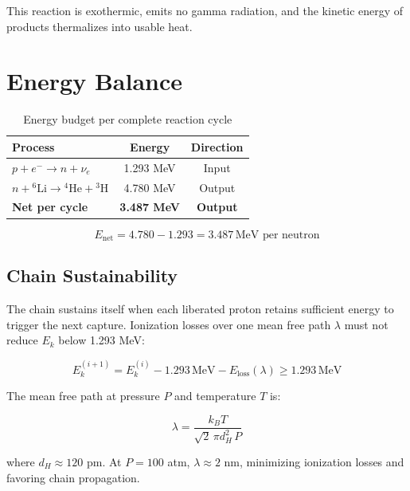 \documentclass[12pt,a4paper]{article}
\begin{document}
This reaction is exothermic, emits no gamma radiation, and
the kinetic energy of products thermalizes into usable heat.

\section{Energy Balance}

\begin{table}[h!]
\centering
\caption{Energy budget per complete reaction cycle}
\vspace{0.5em}
\begin{tabular}{lcc}
\toprule
\textbf{Process} & \textbf{Energy} & \textbf{Direction} \\
\midrule
$p + e^- \rightarrow n + \nu_e$                               & 1.293 MeV & Input  \\
$n + {}^6\text{Li} \rightarrow {}^4\text{He} + {}^3\text{H}$ & 4.780 MeV & Output \\
\midrule
\textbf{Net per cycle}                                         & \textbf{3.487 MeV} & \textbf{Output} \\
\bottomrule
\end{tabular}
\end{table}

\begin{equation}
  \boxed{E_\text{net} = 4.780 - 1.293 = 3.487\,\text{MeV per neutron}}
\end{equation}

\subsection{Chain Sustainability}

The chain sustains itself when each liberated proton retains
sufficient energy to trigger the next capture. Ionization losses
over one mean free path $\lambda$ must not reduce $E_k$ below
1.293 MeV:

\begin{equation}
  E_k^{(i+1)} = E_k^{(i)} - 1.293\,\text{MeV} - E_\text{loss}(\lambda)
  \geq 1.293\,\text{MeV}
\end{equation}

The mean free path at pressure $P$ and temperature $T$ is:

\begin{equation}
  \lambda = \frac{k_B T}{\sqrt{2}\,\pi d_H^2\,P}
\end{equation}

where $d_H \approx 120$ pm. At $P = 100$ atm, $\lambda \approx 2$ nm,
minimizing ionization losses and favoring chain propagation.
\end{document}
